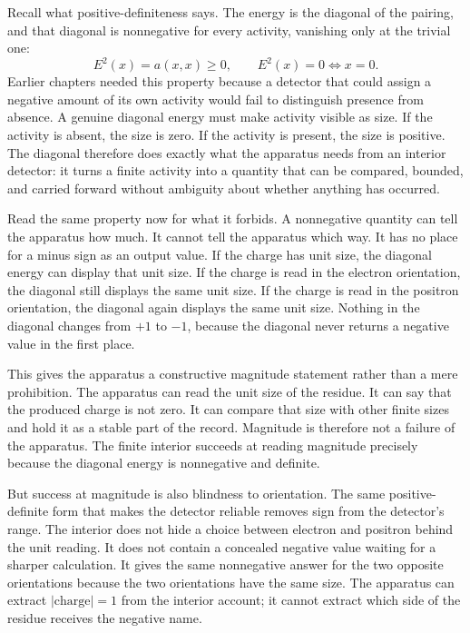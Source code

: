 Recall what positive-definiteness says. The energy is the diagonal of the
pairing, and that diagonal is nonnegative for every activity, vanishing only at
the trivial one:
\[
  E^2(x) = a(x,x) \ge 0,
  \qquad
  E^2(x) = 0 \Leftrightarrow x = 0.
\]
Earlier chapters needed this property because a detector that could assign a
negative amount of its own activity would fail to distinguish presence from
absence. A genuine diagonal energy must make activity visible as size. If the
activity is absent, the size is zero. If the activity is present, the size is
positive. The diagonal therefore does exactly what the apparatus needs from an
interior detector: it turns a finite activity into a quantity that can be
compared, bounded, and carried forward without ambiguity about whether anything
has occurred.

Read the same property now for what it forbids. A nonnegative quantity can tell
the apparatus how much. It cannot tell the apparatus which way. It has no place
for a minus sign as an output value. If the charge has unit size, the diagonal
energy can display that unit size. If the charge is read in the electron
orientation, the diagonal still displays the same unit size. If the charge is
read in the positron orientation, the diagonal again displays the same unit
size. Nothing in the diagonal changes from \(+1\) to \(-1\), because the
diagonal never returns a negative value in the first place.

This gives the apparatus a constructive magnitude statement rather than a mere
prohibition. The apparatus can read the unit size of the residue. It can say
that the produced charge is not zero. It can compare that size with other finite
sizes and hold it as a stable part of the record. Magnitude is therefore not a
failure of the apparatus. The finite interior succeeds at reading magnitude
precisely because the diagonal energy is nonnegative and definite.

But success at magnitude is also blindness to orientation. The same
positive-definite form that makes the detector reliable removes sign from the
detector's range. The interior does not hide a choice between electron and
positron behind the unit reading. It does not contain a concealed negative value
waiting for a sharper calculation. It gives the same nonnegative answer for the
two opposite orientations because the two orientations have the same size. The
apparatus can extract \(|\text{charge}| = 1\) from the interior account; it
cannot extract which side of the residue receives the negative name.

